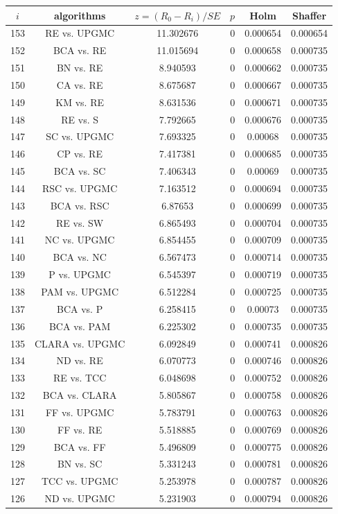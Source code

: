 \documentclass[a4paper,10pt]{article}
\begin{document}
\begin{landscape}
\begin{table}[!htp]
\centering\scriptsize
\begin{tabular}{cccccc}
$i$&algorithms&$z=(R_0 - R_i)/SE$&$p$&Holm&Shaffer\\
\hline153&RE vs. UPGMC&11.302676&0&0.000654&0.000654\\
152&BCA vs. RE&11.015694&0&0.000658&0.000735\\
151&BN vs. RE&8.940593&0&0.000662&0.000735\\
150&CA vs. RE&8.675687&0&0.000667&0.000735\\
149&KM vs. RE&8.631536&0&0.000671&0.000735\\
148&RE vs. S&7.792665&0&0.000676&0.000735\\
147&SC vs. UPGMC&7.693325&0&0.00068&0.000735\\
146&CP vs. RE&7.417381&0&0.000685&0.000735\\
145&BCA vs. SC&7.406343&0&0.00069&0.000735\\
144&RSC vs. UPGMC&7.163512&0&0.000694&0.000735\\
143&BCA vs. RSC&6.87653&0&0.000699&0.000735\\
142&RE vs. SW&6.865493&0&0.000704&0.000735\\
141&NC vs. UPGMC&6.854455&0&0.000709&0.000735\\
140&BCA vs. NC&6.567473&0&0.000714&0.000735\\
139&P vs. UPGMC&6.545397&0&0.000719&0.000735\\
138&PAM vs. UPGMC&6.512284&0&0.000725&0.000735\\
137&BCA vs. P&6.258415&0&0.00073&0.000735\\
136&BCA vs. PAM&6.225302&0&0.000735&0.000735\\
135&CLARA vs. UPGMC&6.092849&0&0.000741&0.000826\\
134&ND vs. RE&6.070773&0&0.000746&0.000826\\
133&RE vs. TCC&6.048698&0&0.000752&0.000826\\
132&BCA vs. CLARA&5.805867&0&0.000758&0.000826\\
131&FF vs. UPGMC&5.783791&0&0.000763&0.000826\\
130&FF vs. RE&5.518885&0&0.000769&0.000826\\
129&BCA vs. FF&5.496809&0&0.000775&0.000826\\
128&BN vs. SC&5.331243&0&0.000781&0.000826\\
127&TCC vs. UPGMC&5.253978&0&0.000787&0.000826\\
126&ND vs. UPGMC&5.231903&0&0.000794&0.000826\\

\end{tabular}
\end{table}
\end{landscape}
\end{document}
